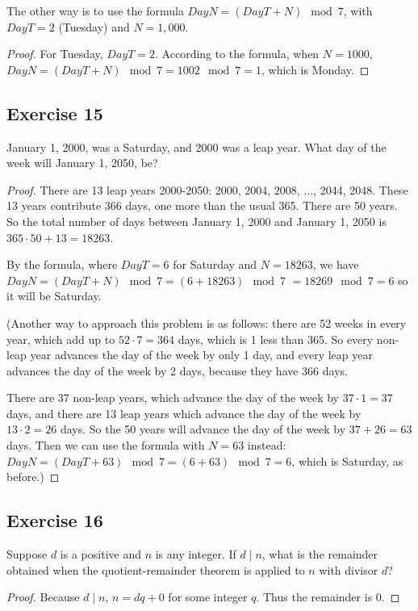 \documentclass[14pt]{extarticle}
\begin{document}
The other way is to use the formula $DayN = (DayT + N) \mod 7$, with $DayT = 2$ (Tuesday) and $N = 1,000$.

\begin{proof}
For Tuesday, $DayT = 2$. According to the formula, when $N  = 1000$, $DayN = (DayT + N) \mod 7 = 1002 \mod 7 = 1$, which is Monday.
\end{proof}

\subsection{Exercise 15}
January 1, 2000, was a Saturday, and 2000 was a leap year. What day of the week will January 1, 2050, be?

\begin{proof}
There are 13 leap years 2000-2050: 2000, 2004, 2008, $\ldots$, 2044, 2048. These 13 years contribute 366 days, one more than the usual 365. There are 50 years. So the total number of days between January 1, 2000 and January 1, 2050 is $365 \cdot 50 + 13 = 18263$.

By the formula, where $DayT = 6$ for Saturday and $N = 18263$, we have $DayN = (DayT + N) \mod 7 = (6 + 18263) \mod 7$ $= 18269 \mod 7 = 6$ so it will be Saturday.

(Another way to approach this problem is as follows: there are 52 weeks in every year, which add up to $52 \cdot 7 = 364$ days, which is 1 less than 365. So every non-leap year advances the day of the week by only 1 day, and every leap year advances the day of the week by 2 days, because they have 366 days.

There are 37 non-leap years, which advance the day of the week by $37 \cdot 1 = 37$ days, and there are 13 leap years which advance the day of the week by $13 \cdot 2 = 26$ days. So the 50 years will advance the day of the week by $37 + 26 = 63$ days. Then we can use the formula with $N = 63$ instead: $DayN = (DayT + 63) \mod 7 = (6 + 63) \mod 7 = 6$, which is Saturday, as before.)
\end{proof}

\subsection{Exercise 16}
Suppose $d$ is a positive and $n$ is any integer. If $d \mid n$, what is the remainder obtained when the quotient-remainder theorem is applied to $n$ with divisor $d$?

\begin{proof}
Because $d\mid n$, $n = dq + 0$ for some integer $q$. Thus the remainder is 0.
\end{proof}
\end{document}
